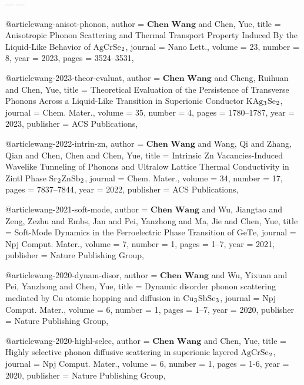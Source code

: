 ---
---

@article{wang-anisot-phonon,
  author =	 {$\textbf{Chen Wang}$ and Chen, Yue},
  title =	 {Anisotropic Phonon Scattering and Thermal Transport Property Induced By the Liquid-Like Behavior of
                 $\mathrm{AgCrSe}$$\textsubscript{2}$},
  journal =	 {Nano Lett.},
  volume =	 23,
  number =	 8,
  year =         2023,
  pages =	 {3524--3531},
}

@article{wang-2023-theor-evaluat,
  author =	 {$\textbf{Chen Wang}$ and Cheng, Ruihuan and Chen, Yue},
  title =	 {Theoretical Evaluation of the Persistence of Transverse Phonons Across a Liquid-Like Transition in Superionic Conductor $\mathrm{KAg}$$\textsubscript{3}$$\mathrm{Se}$$\textsubscript{2}$},
  journal =	 {Chem. Mater.},
  volume =	 35,
  number =	 4,
  pages =	 {1780--1787},
  year =	 2023,
  publisher =	 {ACS Publications},
}

@article{wang-2022-intrin-zn,
  author =	 {$\textbf{Chen Wang}$ and Wang, Qi and Zhang, Qian and Chen, Chen and Chen, Yue},
  title =	 {Intrinsic $\mathrm{Zn}$ Vacancies-Induced Wavelike Tunneling of Phonons and Ultralow Lattice Thermal Conductivity
                  in Zintl Phase $\mathrm{Sr}$$\textsubscript{2}$$\mathrm{Zn}$$\mathrm{Sb}$$\textsubscript{2}$},
  journal =	 {Chem. Mater.},
  volume =	 34,
  number =	 17,
  pages =	 {7837--7844},
  year =	 2022,
  publisher =	 {ACS Publications},
}

@article{wang-2021-soft-mode,
  author =	 {$\textbf{Chen Wang}$ and Wu, Jiangtao and Zeng, Zezhu and Embs, Jan and Pei, Yanzhong and Ma, Jie and Chen, Yue},
  title =	 {Soft-Mode Dynamics in the Ferroelectric Phase Transition of $\mathrm{GeTe}$},
  journal =	 {Npj Comput. Mater.},
  volume =	 7,
  number =	 1,
  pages =	 {1--7},
  year =	 2021,
  publisher =	 {Nature Publishing Group},
}

@article{wang-2020-dynam-disor,
  author =	 {$\textbf{Chen Wang}$ and Wu, Yixuan and Pei, Yanzhong and Chen, Yue},
  title =	 {Dynamic disorder phonon scattering mediated by $\mathrm{Cu}$ atomic hopping and diffusion in $\mathrm{Cu}$$\textsubscript{3}$$\mathrm{SbSe}$$\textsubscript{3}$},
  journal =	 {Npj Comput. Mater.},
  volume =	 6,
  number =	 1,
  pages =	 {1--7},
  year =	 2020,
  publisher =	 {Nature Publishing Group},
}

@article{wang-2020-highl-selec,
  author =	 {$\textbf{Chen Wang}$ and Chen, Yue},
  title =	 {Highly selective phonon diffusive scattering in superionic layered $\mathrm{AgCrSe}$$\textsubscript{2}$},
  journal =	 {Npj Comput. Mater.},
  volume =	 6,
  number =	 1,
  pages =	 {1-6},
  year =	 2020,
  publisher =	 {Nature Publishing Group},
}

